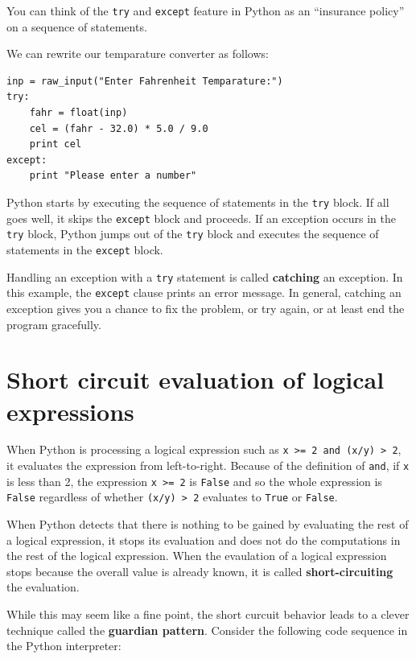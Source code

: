 \documentclass[10pt]{book}
\begin{document}
You can think of the {\tt try} and {\tt except} feature
in Python as an ``insurance policy'' on a sequence of
statements.

We can rewrite our temparature converter as follows:

\beforeverb
\begin{verbatim}
inp = raw_input("Enter Fahrenheit Temparature:")
try:
    fahr = float(inp)
    cel = (fahr - 32.0) * 5.0 / 9.0
    print cel
except:
    print "Please enter a number"
\end{verbatim}
\afterverb
%

Python starts by executing the 
sequence of statements in the 
{\tt try} block.  If all goes
well, it skips the {\tt except} block and proceeds.  If an
exception occurs in the {\tt try} block, 
Python jumps out of the {\tt try} block and
executes the sequence of statements in the {\tt except} block.

Handling an exception with a {\tt try} statement is called {\bf
catching} an exception.  In this example, the {\tt except} clause
prints an error message.  In general,
catching an exception gives you a chance to fix the problem, or try
again, or at least end the program gracefully.

\section{Short circuit evaluation of logical expressions}

When Python is processing a logical expression such as 
{\tt x >= 2 and (x/y) > 2}, it evaluates the expression
from left-to-right.  Because of the definition of {\tt and},
if {\tt x} is less than 2, the expression {\tt x >= 2} is 
{\tt False} and so the whole expression is {\tt False} regardless
of whether {\tt (x/y) > 2} evaluates to {\tt True} or {\tt False}.

When Python detects that there is nothing to be gained by evaluating
the rest of a logical expression, it stops its evaluation and does
not do the computations in the rest of the logical expression.  
When the evaulation of a logical expression stops because the overall
value is already known, it is called {\bf short-circuiting} 
the evaluation.

While this may seem like a fine point, the short curcuit behavior
leads to a clever technique called the {\bf guardian pattern}.  
Consider the following code sequence in the Python interpreter:
\end{document}
